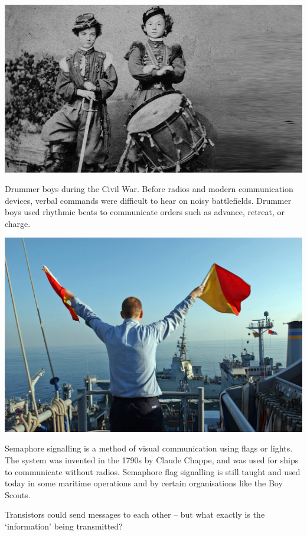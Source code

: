 \begin{marginfigure}
    \includegraphics[width=\linewidth]{img/drummer.jpg}
    \caption{Drummer boys during the Civil War. Before radios and modern communication devices, verbal commands were difficult to hear on noisy battlefields. Drummer boys used rhythmic beats to communicate orders such as advance, retreat, or charge.}
\end{marginfigure}

\begin{marginfigure}
    \includegraphics[width=\linewidth]{img/semaphores.jpg}
    \caption{Semaphore signalling is a method of visual communication using flags or lights. The system was invented in the 1790s by Claude Chappe, and was used for ships to communicate without radios. Semaphore flag signalling is still taught and used today in some maritime operations and by certain organisations like the Boy Scouts.}
\end{marginfigure}

Transistors could send messages to each other – but what exactly is the `information' being transmitted? \bigskip

